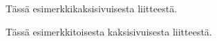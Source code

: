 \documentclass[paper=a4paper,version=final,language=finnish,hidechapters=false,includereferences=false]{utuftthesis}
\begin{document}
\startpages

%
%
%



%
%

\printbibliography
%
%

\pagebreak\addtocounter{page}{-1}


Tässä esimerkki\newpage kaksisivuisesta liitteestä.

Tässä esimerkki\newpage toisesta kaksisivuisesta liitteestä.


%
%
%
%

%
%
\end{document}
